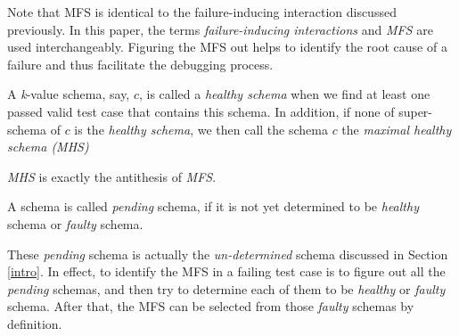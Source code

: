 \documentclass[10pt,journal,cspaper,compsoc]{IEEEtran}
\begin{document}
Note that MFS is identical to the failure-inducing interaction discussed previously. In this paper, the terms \emph{failure-inducing interactions} and \emph{MFS} are used interchangeably. Figuring the MFS out helps to identify the root cause of a failure and thus facilitate the debugging process.

\begin{definition}\label{de:healthy:maximal}
A \emph{k}-value schema, say, $c$, is called a \emph{healthy schema} when we find at least one passed valid test case that contains this schema. In addition, if none of super-schema of $c$ is the \emph{healthy schema}, we then call the schema $c$ the \emph{maximal healthy schema (MHS)}
\end{definition}

\emph{MHS} is exactly the antithesis of \emph{MFS}. 

\begin{definition}[Pending]\label{de:pending}
A schema is called \emph{pending} schema, if it is not yet determined to be \emph{healthy} schema or \emph{faulty} schema.
\end{definition}

These \emph{pending} schema is actually the \emph{un-determined} schema discussed in Section \ref{intro}. In effect, to identify the MFS in a failing test case is to figure out all the \emph{pending} schemas, and then try to determine each of them to be \emph{healthy} or \emph{faulty} schema. After that, the MFS can be selected from those \emph{faulty} schemas by definition.


%
%
\end{document}
